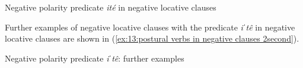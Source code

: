 \ea\label{ex:13:postural verbs in negative clauses 2first}
{Negative polarity predicate \textit{ité} in negative locative clauses}\\

    \label{ex:13:postural verbs in negative clauses 2firsta}
        \label{ex:13:postural verbs in negative clauses 2firstb}
    \z
\z

Further examples of negative locative clauses with the predicate \textit{iˈtê} in negative locative clauses are shown in (\ref{ex:13:postural verbs in negative clauses 2second}).

\ea\label{ex:13:postural verbs in negative clauses 2second}
{Negative polarity predicate \textit{iˈtê}: further examples}\\


